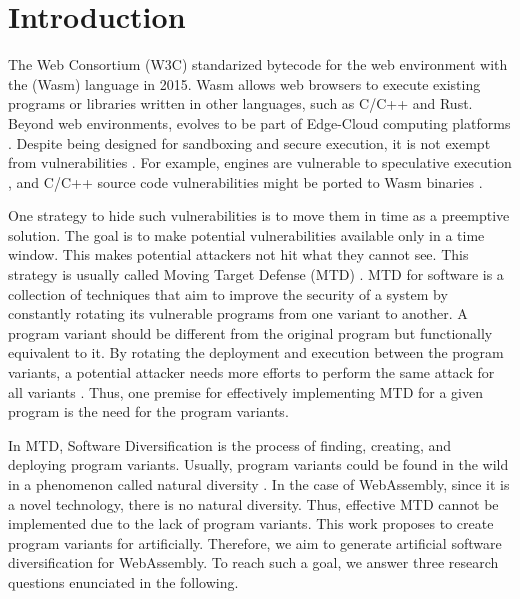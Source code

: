 \chapter{Introduction}
\label{chapter:intro}


The Web Consortium (W3C) standarized bytecode for the web environment with the \wasm (Wasm) language in 2015. 
Wasm allows web browsers to execute existing programs or libraries written in other languages, such as C/C++ and Rust.
Beyond web environments, \wasm evolves to be part of Edge-Cloud computing platforms \cite{9640153, wen2020wasmachine}. 
Despite being designed for sandboxing and secure execution, it is not exempt from vulnerabilities \cite{WebAssemblySecurity}.
For example, \wasm engines are vulnerable to speculative execution \cite{Narayan2021Swivel}, and C/C++ source code vulnerabilities might be ported to Wasm binaries \cite{DeRoover2022}.  

One strategy to hide such vulnerabilities is to move them in time as a preemptive solution.
The goal is to make potential vulnerabilities available only in a time window. This makes potential attackers not hit what they cannot see.  
This strategy is usually called Moving Target Defense (MTD) \cite{MTDNationalCyberLaep, okhravi2013survey}. 
MTD for software is a collection of techniques that aim to improve the security of a system by constantly rotating its vulnerable programs from one variant to another. 
A program variant should be different from the original program but functionally equivalent to it.
By rotating the deployment and execution between the program variants, a potential attacker needs more efforts to perform the same attack for all variants \cite{sengupta}.
Thus, one premise for effectively implementing MTD for a given program is the need for the program variants.


In MTD, Software Diversification is the process of finding, creating, and deploying program variants.
Usually, program variants could be found in the wild in a phenomenon called natural diversity \cite{Harrand1650630}. In the case of WebAssembly, since it is a novel technology, there is no natural diversity. Thus, effective MTD cannot be implemented due to the lack of program variants.
This work proposes to create program variants for \wasm artificially. 
Therefore, we aim to generate artificial software diversification for WebAssembly.
To reach such a goal, we answer three research questions enunciated in the following.

